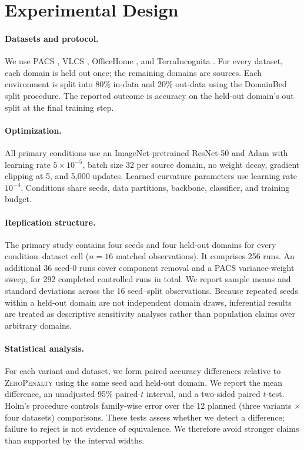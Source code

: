 \documentclass[10pt]{article}
\newcommand{\control}{\textsc{ZeroPenalty}}
\begin{document}
\section{Experimental Design}
\label{sec:experiments}

\paragraph{Datasets and protocol.}
We use PACS \citep{li2017deeper}, VLCS \citep{fang2013unbiased}, OfficeHome
\citep{venkateswara2017deep}, and TerraIncognita
\citep{beery2018recognition}. For every dataset, each domain is held out once;
the remaining domains are sources. Each environment is split into 80\% in-data
and 20\% out-data using the DomainBed split procedure. The reported outcome is
accuracy on the held-out domain's out split at the final training step.

\paragraph{Optimization.}
All primary conditions use an ImageNet-pretrained ResNet-50
\citep{he2016deep} and Adam \citep{kingma2014adam} with learning
rate $5\times10^{-5}$, batch size 32 per source domain, no weight decay,
gradient clipping at 5, and 5,000 updates. Learned curvature parameters use
learning rate $10^{-4}$. Conditions share seeds, data partitions, backbone,
classifier, and training budget.

\paragraph{Replication structure.}
The primary study contains four seeds and four held-out domains for every
condition--dataset cell ($n=16$ matched observations). It comprises 256 runs.
An additional 36 seed-0 runs cover component removal and a PACS variance-weight
sweep, for 292 completed controlled runs in total. We report sample means and
standard deviations across the 16 seed--split observations. Because repeated
seeds within a held-out domain are not independent domain draws, inferential
results are treated as descriptive sensitivity analyses rather than population
claims over arbitrary domains.

\paragraph{Statistical analysis.}
For each variant and dataset, we form paired accuracy differences relative to
\control{} using the same seed and held-out domain. We report the mean difference,
an unadjusted 95\% paired-$t$ interval, and a two-sided paired $t$-test. Holm's
procedure controls family-wise error over the 12 planned
(three variants $\times$ four datasets) comparisons. These tests assess whether
we detect a difference; failure to reject is not evidence of equivalence. We
therefore avoid stronger claims than supported by the interval widths.
\end{document}
